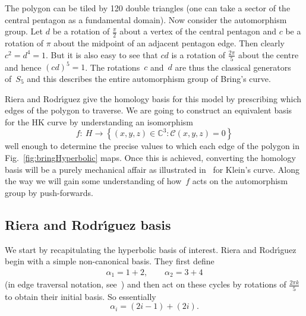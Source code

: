 \documentclass[pdftex]{sigma}
\numberwithin{equation}{section}
\begin{document}
The polygon can be tiled by 120 double triangles (one can take a sector of
the central pentagon as a fundamental domain). Now consider the
automorphism group. Let $d$ be a rotation of $\frac{\pi}{2}$ about a
vertex of the central pentagon and $c$ be a rotation of $\pi$ about
the midpoint of an adjacent pentagon edge. Then clearly $c^2 = d^4 =
1$. But it is also easy to see that $cd$ is a rotation of
$\frac{2\pi}{5}$ about the centre and hence $(cd)^5 = 1$. The rotations~$c$ and~$d$
are thus the classical generators of~$S_5$ and this describes the
entire automorphism group of Bring's curve.

Riera and Rodr{\'{\i}}guez give the homology basis for this model by
prescribing which edges of the polygon to traverse. We are going to
construct an equivalent basis for the HK curve by understanding an
isomorphism
\begin{equation}
\label{hypiso}
f : \ H \rightarrow
  \left\{(x,y,z)\in\mathbb{C}^3 : \mathcal{C}(x,y,z) = 0 \right\}
\end{equation}
well enough to determine the precise values to which each edge of the polygon
in Fig.~\ref{fig:bringHyperbolic} maps. Once this is achieved,
converting the homology basis will be a purely mechanical af\/fair as illustrated
in~\cite{bn10} for Klein's curve. Along the way we will gain some understanding of how~$f$ acts on the automorphism group by push-forwards.

\subsection{Riera and Rodr{\'{\i}}guez basis}\label{section4.2}

We start by recapitulating the hyperbolic basis of interest.
Riera and Rodr{\'{\i}}guez begin with a simple non-canonical basis. They
f\/irst def\/ine
\begin{gather*}
  \alpha_1  = 1 + 2, \qquad
  \alpha_2  = 3 + 4
\end{gather*}
(in edge traversal notation, see~\cite{rauch, riera}) and then act on these cycles by rotations of
$\frac{2\pi k}{5}$ to obtain their initial basis. So essentially
\[
  \alpha_i = (2i-1) + (2i).
\]
\end{document}
